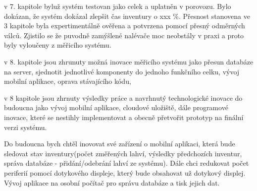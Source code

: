 v 7. kapitole byluž systém testovan jako celek a uplatněn v porovozu. Bylo dokázan, že systém dokázal zlepšit čas inventury o xxx \%. Přesnost stanovena ve 3 kapitole byla expertimentálně ověřena a potvrzena pomocí přesný odměrných válců. Zjistilo se že puvodně zamýšlené nalévače moc neobstály v praxi a proto byly vyloučeny z měřicího systému.

v 8. kapitole jsou zhrunuty možná inovace měřicího systému jako přesun databáze na server, sjednotit jednotlivé komponenty do jednoho funkčního celku, vývoj mobilní aplikace, oprava stávajícího kódu,

v 8 kapitole jsou zhrnuty výsledky práce a navrhnutý technologické inovace do budoucna jako vývoj mobilní aplikace, cloudové uložiště, dále programové inovace, které se nestihly implementovat a obecně přetvořit prototyp na finální verzi systému. 

Do budoucna bych chtěl inovovat své zařízení o mobilní aplikaci, která bude sledovat stav inventury(počet změřených lahví, výsledky předchozích inventur, správa databáze - přidání/odebrání lahví ze systému). Dále chci redukovat počet periferií pomocí dotykového displeje, který bude obsahovat už dotykový displej. Vývoj aplikace na osobní počítač pro správu databáze a tisk jejich dat. %








